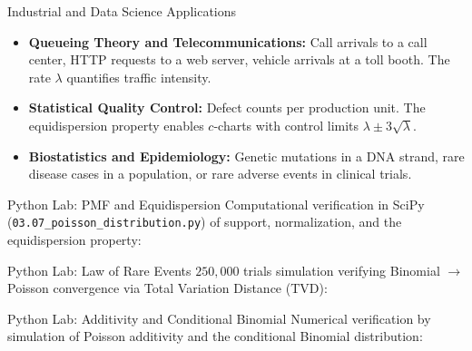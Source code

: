 \documentclass[aspectratio=169,xcolor={dvipsnames,table}]{beamer}
\begin{document}
\begin{frame}{Industrial and Data Science Applications}
	\vspace{-0.1cm}
	\begin{itemize}\itemsep=0.1cm
		\item \textbf{Queueing Theory and Telecommunications:} Call arrivals to a call center, HTTP requests to a web server, vehicle arrivals at a toll booth. The rate $\lambda$ quantifies traffic intensity. \pause
		\item \textbf{Statistical Quality Control:} Defect counts per production unit. The equidispersion property enables $c$-charts with control limits $\lambda \pm 3\sqrt{\lambda}$. \pause
		\item \textbf{Biostatistics and Epidemiology:} Genetic mutations in a DNA strand, rare disease cases in a population, or rare adverse events in clinical trials.
	\end{itemize}
\end{frame}

\begin{frame}[fragile]{Python Lab: PMF and Equidispersion}
	\vspace{-0.05cm}
	\scriptsize
	Computational verification in SciPy (\texttt{03.07\_poisson\_distribution.py}) of support, normalization, and the equidispersion property:
	\vspace{0.05cm}
	{
	}
\end{frame}

\begin{frame}[fragile]{Python Lab: Law of Rare Events}
	\vspace{-0.05cm}
	\scriptsize
	$250,000$ trials simulation verifying Binomial $\to$ Poisson convergence via Total Variation Distance (TVD):
	\vspace{0.02cm}
	{
	}
\end{frame}

\begin{frame}[fragile]{Python Lab: Additivity and Conditional Binomial}
	\vspace{-0.05cm}
	\scriptsize
	Numerical verification by simulation of Poisson additivity and the conditional Binomial distribution:
	\vspace{0.02cm}
	{
	}
\end{frame}
\end{document}
